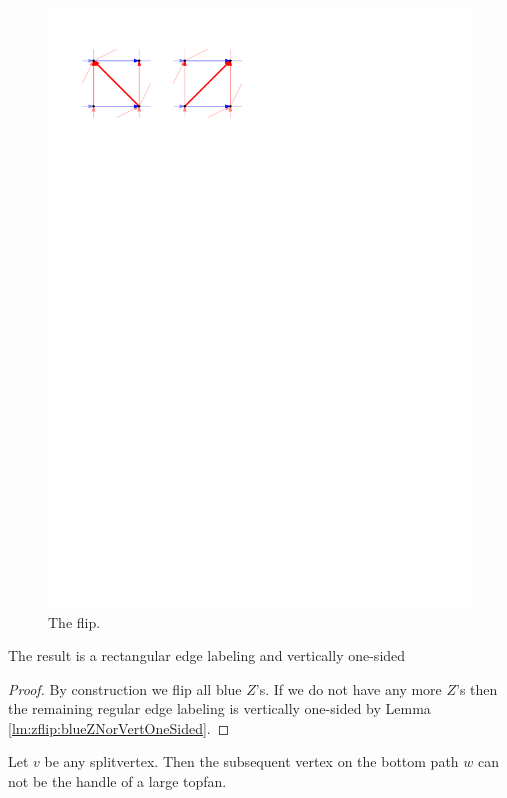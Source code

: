   \begin{figure}[h]
    \centering
    \includegraphics[scale=1]{unifiedAlgo/img/zflip/flip.pdf}
    \caption{The flip.}
    \label{fig:zflip:flip}
  \end{figure}

  \begin{lemma}
    \label{lm:sweep:vertOnsided}
    The result is a rectangular edge labeling and vertically one-sided
  \end{lemma}
  \begin{proof}
    By construction we flip all blue $Z$'s. If we do not have any more $Z$'s then the remaining regular edge labeling is vertically one-sided by Lemma \ref{lm:zflip:blueZNorVertOneSided}.
  \end{proof}

  \begin{lemma}
    \label{lm:zflip:NoTwoSplitsAboveEachOtherVertOnesided}
    Let $v$ be any splitvertex. Then the subsequent vertex on the bottom path $w$ can not be the handle of a large topfan.
  \end{lemma}

